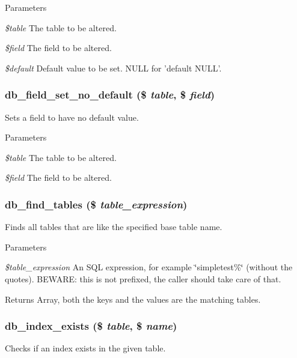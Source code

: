 \begin{DoxyParams}{Parameters}
\item[{\em \$table}]The table to be altered. \item[{\em \$field}]The field to be altered. \item[{\em \$default}]Default value to be set. NULL for 'default NULL'. \end{DoxyParams}
\hypertarget{group__schemaapi_gad1714b6920155f673f4291845fdb5f62}{
\subsubsection[{db\_\-field\_\-set\_\-no\_\-default}]{\setlength{\rightskip}{0pt plus 5cm}db\_\-field\_\-set\_\-no\_\-default (\$ {\em table}, \/  \$ {\em field})}}
\label{group__schemaapi_gad1714b6920155f673f4291845fdb5f62}
Sets a field to have no default value.


\begin{DoxyParams}{Parameters}
\item[{\em \$table}]The table to be altered. \item[{\em \$field}]The field to be altered. \end{DoxyParams}
\hypertarget{group__schemaapi_gac723bfddd5f133eb4d3dcec84c3c3f3c}{
\subsubsection[{db\_\-find\_\-tables}]{\setlength{\rightskip}{0pt plus 5cm}db\_\-find\_\-tables (\$ {\em table\_\-expression})}}
\label{group__schemaapi_gac723bfddd5f133eb4d3dcec84c3c3f3c}
Finds all tables that are like the specified base table name.


\begin{DoxyParams}{Parameters}
\item[{\em \$table\_\-expression}]An SQL expression, for example \char`\"{}simpletest\%\char`\"{} (without the quotes). BEWARE: this is not prefixed, the caller should take care of that.\end{DoxyParams}
\begin{DoxyReturn}{Returns}
Array, both the keys and the values are the matching tables. 
\end{DoxyReturn}
\hypertarget{group__schemaapi_ga0c10c365922d538e4d5d17fb314d4b79}{
\subsubsection[{db\_\-index\_\-exists}]{\setlength{\rightskip}{0pt plus 5cm}db\_\-index\_\-exists (\$ {\em table}, \/  \$ {\em name})}}
\label{group__schemaapi_ga0c10c365922d538e4d5d17fb314d4b79}
Checks if an index exists in the given table.


